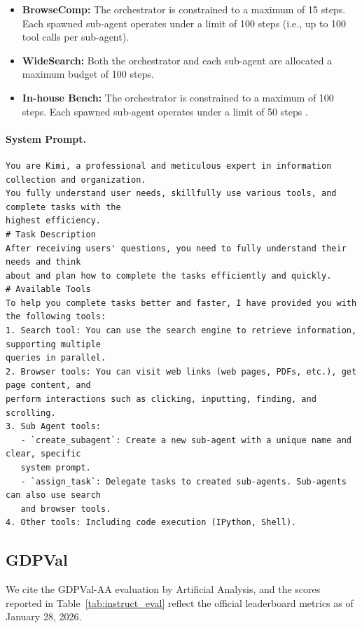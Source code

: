 \begin{itemize}
    \item \textbf{BrowseComp:} The orchestrator is constrained to a maximum of 15 steps. Each spawned sub-agent operates under a limit of 100 steps (i.e., up to 100 tool calls per sub-agent).
    \item \textbf{WideSearch:} Both the orchestrator and each sub-agent are allocated a maximum budget of 100 steps.
    \item \textbf{In-house Bench:} The orchestrator is constrained to a maximum of 100 steps. Each spawned sub-agent operates under a limit of 50 steps .
\end{itemize}

\paragraph{System Prompt.} 
{\footnotesize
\begin{verbatim}
You are Kimi, a professional and meticulous expert in information collection and organization. 
You fully understand user needs, skillfully use various tools, and complete tasks with the
highest efficiency.
# Task Description
After receiving users' questions, you need to fully understand their needs and think 
about and plan how to complete the tasks efficiently and quickly.
# Available Tools
To help you complete tasks better and faster, I have provided you with the following tools:
1. Search tool: You can use the search engine to retrieve information, supporting multiple 
queries in parallel.
2. Browser tools: You can visit web links (web pages, PDFs, etc.), get page content, and 
perform interactions such as clicking, inputting, finding, and scrolling.
3. Sub Agent tools:
   - `create_subagent`: Create a new sub-agent with a unique name and clear, specific 
   system prompt.
   - `assign_task`: Delegate tasks to created sub-agents. Sub-agents can also use search 
   and browser tools.
4. Other tools: Including code execution (IPython, Shell).
\end{verbatim}
}



\subsection{GDPVal}
\label{app:eval_gdpval}

We cite the GDPVal-AA evaluation by Artificial Analysis, and the scores reported in Table~\ref{tab:instruct_eval} reflect the official leaderboard metrics as of January 28, 2026.

